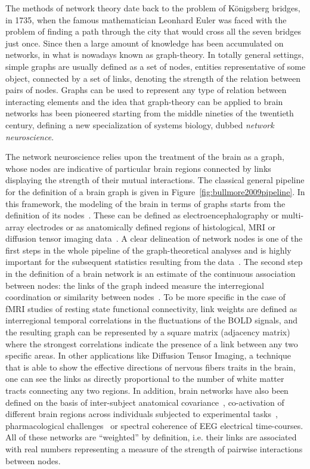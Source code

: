 The methods of network theory date back to the problem of K{\"o}nigsberg bridges, in 1735, when the famous mathematician Leonhard Euler was faced with the problem of finding a path through the city that would cross all the seven bridges just once.
Since then a large amount of knowledge has been accumulated on networks, in what is nowadays known as graph-theory.
In totally general settings, simple graphs are usually defined as a set of nodes, entities representative of some object, connected by a set of links, denoting the strength of the relation between pairs of nodes.
Graphs can be used to represent any type of relation between interacting elements and the idea that graph-theory can be applied to brain networks has been pioneered starting from the middle nineties of the twentieth century, defining a new specialization of systems biology, dubbed \emph{network neuroscience}.

The network neuroscience relies upon the treatment of the brain as a graph, whose nodes are indicative of particular brain regions connected by links displaying the strength of their mutual interactions. The classical general pipeline for the definition of a brain graph is given in Figure~\ref{fig:bullmore2009pipeline}.
In this framework, the modeling of the brain in terms of graphs starts from the definition of its nodes~\cite{stanley2013}. These can be defined as electroencephalography or multi-array electrodes or as anatomically defined regions of histological, MRI or diffusion tensor imaging data~\cite{vandenheuvel2010}.
A clear delineation of network nodes is one of the first steps in the whole pipeline of the graph-theoretical analyses and is highly important for the subsequent statistics resulting from the data~\cite{stanley2013}.
The second step in the definition of a brain network is an estimate of the continuous association between nodes: the links of the graph indeed measure the interregional coordination or similarity between nodes~\cite{pereda2005a}.
To be more specific in the case of fMRI studies of resting state functional connectivity, link weights are defined as interregional temporal correlations in the fluctuations of the BOLD signals, and the resulting graph can be represented by a square matrix (adjacency matrix) where the strongest correlations indicate the presence of a link between any two specific areas.
In other applications like Diffusion Tensor Imaging, a technique that is able to show the effective directions of nervous fibers traits in the brain, one can see the links as directly proportional to the number of white matter tracts connecting any two regions.
In addition, brain networks have also been defined on the basis of inter-subject anatomical covariance~\cite{evans2013,he2007}, co-activation of different brain regions across individuals subjected to experimental tasks~\cite{crossley2013a}, pharmacological challenges~\cite{schwarz2007,schwarz2008} or spectral coherence of EEG electrical time-courses.
All of these networks are ``weighted'' by definition, i.e. their links are associated with real numbers representing a measure of the strength of pairwise interactions between nodes.

